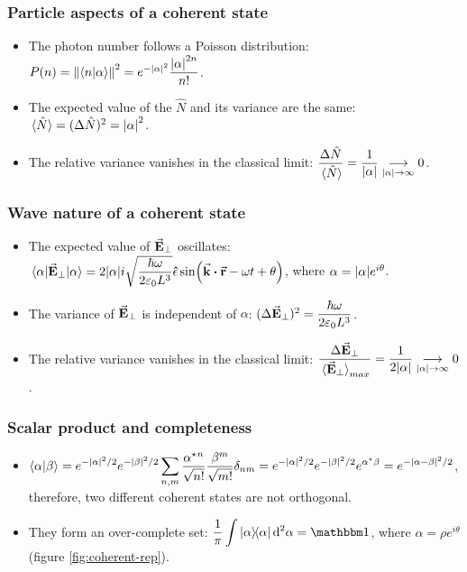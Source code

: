 \subsubsection*{Particle aspects of a coherent state}
\begin{itemize}
	\item The photon number follows a Poisson distribution: $P(n) = \norm{\braket{n}{\alpha}}^{2} = e^{-\abs{\alpha}^{2}} \dfrac{\abs{\alpha}^{2n}}{n!}$.
	\item The expected value of the $\hat{N}$ and its variance are the same: $\ev*{\hat{N}} = (\Delta \hat{N})^{2} = \abs{\alpha}^{2}$.
	\item The relative variance vanishes in the classical limit: $\dfrac{\Delta \hat{N}}{\ev*{\hat{N}}} = \dfrac{1}{\abs{\alpha}} \underset{\abs{\alpha} \to \infty}{\longrightarrow} 0$.
\end{itemize}

\subsubsection*{Wave nature of a coherent state}
\begin{itemize}
	\item The expected value of ${\va{E}}_{\perp}$ oscillates: $\ev{\trn{\va{E}}}{\alpha} = 2 \abs{\alpha} i \sqrt{\dfrac{\hbar \omega}{2 \varepsilon_{0} L^{3}}} \vu{\epsilon} \sin( \va{k} \vdot \va{r} - \omega t + \theta )$, where $\alpha = \abs{\alpha} e^{i \theta}$.
	\item The variance of ${\va{E}}_{\perp}$ is independent of $\alpha$: $(\Delta {\va{E}}_{\perp})^{2} = \dfrac{\hbar \omega}{2 \varepsilon_{0} L^{3}}$.
	\item The relative variance vanishes in the classical limit: $\dfrac{\Delta \trn{\va{E}}}{\ev*{\trn{\va{E}}}_{max}} = \dfrac{1}{2 \abs{\alpha}} \underset{\abs{\alpha} \to \infty}{\longrightarrow} 0$.
\end{itemize}

\subsubsection*{Scalar product and completeness}
\begin{itemize}
	\item $\displaystyle \braket{\alpha}{\beta} = e^{-\abs{\alpha}^{2}/2} e^{-\abs{\beta}^{2}/2} \sum_{n,m} \frac{\alpha^{\star}{}^{n}}{\sqrt{n!}} \frac{\beta^{m}}{\sqrt{m!}} \delta_{nm} = e^{-\abs{\alpha}^{2}/2} e^{-\abs{\beta}^{2}/2} e^{\alpha^{\star}{} \beta} = e^{-\abs{\alpha - \beta}^{2}/2}$, therefore, two different coherent states are not orthogonal.
	\item They form an over-complete set: $\dsp \frac{1}{\pi} \int \dyad{\alpha} \dd[2]{\alpha} = \bbid$, where $\alpha = \rho e^{i\theta}$ (figure \ref{fig:coherent-rep}).
\end{itemize}

